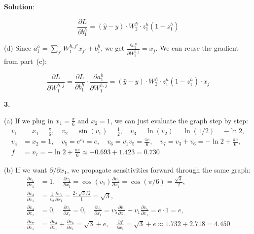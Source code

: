 \documentclass[submit]{../harvardml}
\newenvironment{solution}{
    \vspace{2mm}
    \color{blue}\noindent\textbf{Solution}:
}{}
\begin{document}
\begin{solution}
\[
\frac{\partial L}{\partial b_1^h} = (\hat{y} - y) \cdot W_2^h \cdot z_1^h(1-z_1^h)
\]

(d) Since $a_1^h = \sum_{j'} W_1^{h,j'} x_{j'} + b_1^h$, we get $\frac{\partial a_1^h}{\partial W_1^{h,j}} = x_j$. We can reuse the gradient from part~(c):

\[
\frac{\partial L}{\partial W_1^{h,j}} = \frac{\partial L}{\partial b_1^h} \cdot \frac{\partial a_1^h}{\partial W_1^{h,j}} = (\hat{y} - y) \cdot W_2^h \cdot z_1^h(1-z_1^h) \cdot x_j
\]

\textbf{3.}

(a) If we plug in $x_1 = \frac{\pi}{6}$ and $x_2 = 1$, we can just evaluate the graph step by step:
\begin{align*}
v_1 &= x_1 = \frac{\pi}{6}, \quad v_2 = \sin(v_1) = \frac{1}{2}, \quad v_3 = \ln(v_2) = \ln(1/2) = -\ln 2, \\
v_4 &= x_2 = 1, \quad v_5 = e^{v_4} = e, \quad v_6 = v_1 v_5 = \frac{\pi e}{6}, \quad v_7 = v_3 + v_6 = -\ln 2 + \frac{\pi e}{6}, \\
f &= v_7 = -\ln 2 + \frac{\pi e}{6} \approx -0.693 + 1.423 = 0.730
\end{align*}

(b) If we want $\partial/\partial x_1$, we propagate sensitivities forward through the same graph:
\begin{align*}
\frac{\partial v_1}{\partial x_1} &= 1, \quad \frac{\partial v_2}{\partial x_1} = \cos(v_1) \frac{\partial v_1}{\partial x_1} = \cos(\pi/6) = \frac{\sqrt{3}}{2}, \\
\frac{\partial v_3}{\partial x_1} &= \frac{1}{v_2} \frac{\partial v_2}{\partial x_1} = \frac{2 \cdot \sqrt{3}/2}{1} = \sqrt{3}, \\
\frac{\partial v_4}{\partial x_1} &= 0, \quad \frac{\partial v_5}{\partial x_1} = 0, \quad \frac{\partial v_6}{\partial x_1} = v_5 \frac{\partial v_1}{\partial x_1} + v_1 \frac{\partial v_5}{\partial x_1} = e \cdot 1 = e, \\
\frac{\partial v_7}{\partial x_1} &= \frac{\partial v_3}{\partial x_1} + \frac{\partial v_6}{\partial x_1} = \sqrt{3} + e, \quad \frac{\partial f}{\partial x_1} = \sqrt{3} + e \approx 1.732 + 2.718 = 4.450
\end{align*}
\end{solution}


\newpage

\end{document}
